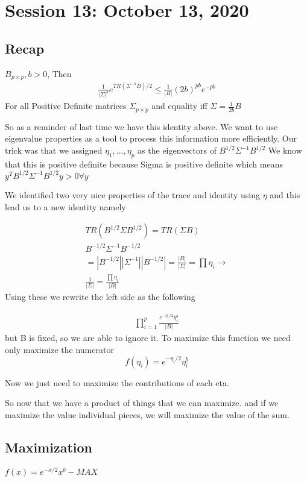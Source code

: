 \chapter{Session 13: October 13, 2020}
\section{Recap}
\(B_{p\times p}, b>0\), Then
\begin{align*}
    \frac{1}{|\Sigma|^b}e^{TR(\Sigma^{-1}B)/2}\leq
    \frac{1}{|B|}(2b)^{pb}e^{-pb}
\end{align*}
For all Positive Definite matrices $\Sigma_{p \times p}$ and equality iff $\Sigma = \frac{1}{2b}B$

So as a reminder of last time we have this identity above. We want to use eigenvalue properties as a tool to process this information more efficiently. Our trick was that we assigned
$\eta_1,...,\eta_p$ as the eigenvectors of $B^{1/2}\Sigma^{-1}B^{1/2}$ We know that this is positive definite because Sigma is positive definite which means $y^TB^{1/2}\Sigma^{-1}B^{1/2}y > 0 \forall y$  

We identified two very nice properties of the trace and identity using $\eta$ and this lead us to a new identity namely

\begin{gather*}
    TR(B^{1/2}\Sigma B^{1/2}) =TR(\Sigma B) \\
    B^{-1/2}\Sigma^{-1} B^{-1/2} \\
    = |B^{-1/2}||\Sigma^{-1}||B^{-1/2}| 
    = \frac{|B|}{|\Sigma|}
    = \prod \eta_i \rightarrow\\ \frac{1}{|\Sigma|} = \frac{\prod \eta_i}{|B|}
\end{gather*}
Using these we rewrite the left side as the following


\begin{align*}
    \displaystyle\prod_{i=1}^p \frac{e^{-\eta_i/2}\eta_i^b}{|B|}
\end{align*}
but B is fixed, so we are able to ignore it. To maximize this function we need only maximize the numerator
\[f(\eta_i)=e^{-\eta_i/2}\eta_i^b\]

Now we just need to maximize the contributions of each eta.

So now that we have a product of things that we can maximize. and if we maximize the value individual pieces, we will maximize the value of the sum.

\section{Maximization}
$f(x) = e^{-x/2}x^b - MAX$

